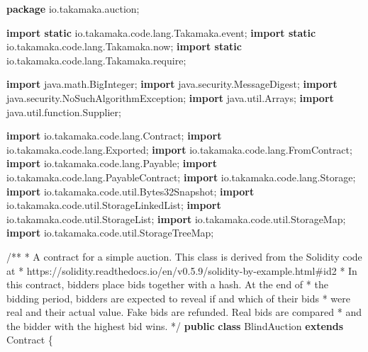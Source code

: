 \documentclass[a4paper,]{book}
\newenvironment{Shaded}{\begin{snugshade}}{\end{snugshade}}
\newcommand{\CommentTok}[1]{\textcolor[rgb]{0.54,0.53,0.53}{#1}}
\newcommand{\ImportTok}[1]{\textcolor[rgb]{1.00,0.33,0.00}{#1}}
\newcommand{\KeywordTok}[1]{\textcolor[rgb]{0.12,0.11,0.11}{\textbf{#1}}}
\newcommand{\NormalTok}[1]{\textcolor[rgb]{0.12,0.11,0.11}{#1}}
\renewenvironment{Shaded}{\begin{snugshade}\small}{\end{snugshade}}
\begin{document}
{\begin{Shaded}
\begin{Highlighting}[]
\KeywordTok{package}\ImportTok{ io.takamaka.auction;}

\KeywordTok{import static}\ImportTok{ io.takamaka.code.lang.Takamaka.event;}
\KeywordTok{import static}\ImportTok{ io.takamaka.code.lang.Takamaka.now;}
\KeywordTok{import static}\ImportTok{ io.takamaka.code.lang.Takamaka.require;}

\KeywordTok{import}\ImportTok{ java.math.BigInteger;}
\KeywordTok{import}\ImportTok{ java.security.MessageDigest;}
\KeywordTok{import}\ImportTok{ java.security.NoSuchAlgorithmException;}
\KeywordTok{import}\ImportTok{ java.util.Arrays;}
\KeywordTok{import}\ImportTok{ java.util.function.Supplier;}

\KeywordTok{import}\ImportTok{ io.takamaka.code.lang.Contract;}
\KeywordTok{import}\ImportTok{ io.takamaka.code.lang.Exported;}
\KeywordTok{import}\ImportTok{ io.takamaka.code.lang.FromContract;}
\KeywordTok{import}\ImportTok{ io.takamaka.code.lang.Payable;}
\KeywordTok{import}\ImportTok{ io.takamaka.code.lang.PayableContract;}
\KeywordTok{import}\ImportTok{ io.takamaka.code.lang.Storage;}
\KeywordTok{import}\ImportTok{ io.takamaka.code.util.Bytes32Snapshot;}
\KeywordTok{import}\ImportTok{ io.takamaka.code.util.StorageLinkedList;}
\KeywordTok{import}\ImportTok{ io.takamaka.code.util.StorageList;}
\KeywordTok{import}\ImportTok{ io.takamaka.code.util.StorageMap;}
\KeywordTok{import}\ImportTok{ io.takamaka.code.util.StorageTreeMap;}

\CommentTok{/**}
 \CommentTok{*}\NormalTok{ A contract for a simple auction}\CommentTok{. }\NormalTok{This class is derived from the Solidity code at}
 \CommentTok{*}\NormalTok{ https}\CommentTok{://}\NormalTok{solidity}\CommentTok{.}\NormalTok{readthedocs}\CommentTok{.}\NormalTok{io}\CommentTok{/}\NormalTok{en}\CommentTok{/}\NormalTok{v0}\CommentTok{.5.9/}\NormalTok{solidity}\CommentTok{-}\NormalTok{by}\CommentTok{-}\NormalTok{example}\CommentTok{.}\NormalTok{html}\CommentTok{#}\NormalTok{id}\CommentTok{2}
 \CommentTok{*}\NormalTok{ In this contract}\CommentTok{,}\NormalTok{ bidders place bids together with a hash}\CommentTok{.}\NormalTok{ At the end of}
 \CommentTok{*}\NormalTok{ the bidding period}\CommentTok{,}\NormalTok{ bidders are expected to reveal if and which of their bids}
 \CommentTok{*}\NormalTok{ were real and their actual value}\CommentTok{.}\NormalTok{ Fake bids are refunded}\CommentTok{.}\NormalTok{ Real bids are compared}
 \CommentTok{*}\NormalTok{ and the bidder with the highest bid wins}\CommentTok{.}
 \CommentTok{*/}
\KeywordTok{public} \KeywordTok{class}\NormalTok{ BlindAuction }\KeywordTok{extends}\NormalTok{ Contract \{}


\end{Highlighting}
\end{Shaded}}
\end{document}

